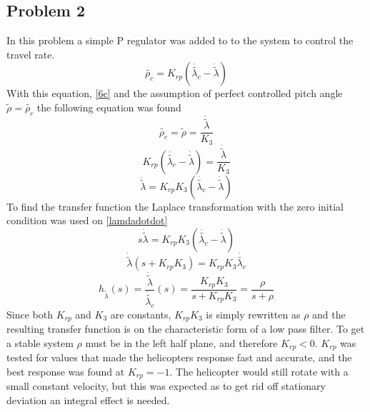 \subsection{Problem 2}
In this problem a simple P regulator was added to to the system to control the travel rate.
\begin{equation}\label{eq:lamda_P}
    {\tilde{\rho_c}} = K_{rp} (\dot{\tilde{\lambda_c}} -\dot{\tilde{\lambda}})
\end{equation}
With this equation, \eqref{6c} and the assumption of perfect controlled pitch angle $\tilde{\rho} = \tilde{\rho_c}$ the following equation was found 
\begin{equation*}
    \tilde{\rho_c} = \tilde{\rho} = \frac{\ddot{\tilde{\lambda}}}{K_3}
\end{equation*}
\begin{equation*}
    K_{rp}( \dot{\tilde{\lambda_c}} -\dot{\tilde{\lambda}}) = \frac{\ddot{\tilde{\lambda}}}{K_3}
\end{equation*}
\begin{equation}\label{lamdadotdot}
    \ddot{\tilde{\lambda}} = K_{rp} K_3 (\dot{\tilde{\lambda_c}} -\dot{\tilde{\lambda}})
\end{equation}
To find the transfer function the Laplace transformation with the zero initial condition was used on \eqref{lamdadotdot}
\begin{equation*}
    s\dot{\tilde{\lambda}} = K_{rp} K_3 (\dot{\tilde{\lambda_c}} -\dot{\tilde{\lambda}})
\end{equation*}
\begin{equation*}
    \dot{\tilde{\lambda}}(s + K_{rp} K_3) = K_{rp} K_3 \dot{\tilde{\lambda_c}}
\end{equation*}
\begin{equation}\label{translambdadot}
    h_{\dot{\tilde{\lambda}}}(s) = \frac{\dot{\tilde{\lambda}}}{\dot{\tilde{\lambda_c}}}(s) = \frac{K_{rp} K_3}{s + K_{rp} K_3} = \frac{\rho}{s + \rho}
\end{equation}
Since both $K_{rp}$ and $K_3$ are constants, $K_{rp} K_3$ is simply rewritten as $\rho$ and the resulting transfer function is on the characteristic form of a low pass filter. To get a stable system $\rho$ must be in the left half plane, and therefore $K_{rp}<0$. $K_{rp}$ was tested for values that made the helicopters response fast and accurate, and the best response was found at $K_{rp} = -1$. The helicopter would still rotate with a small constant velocity, but this was expected as to get rid off stationary deviation an integral effect is needed. 

